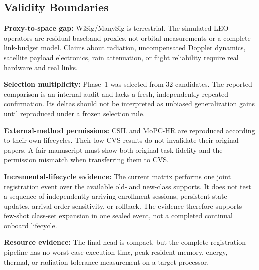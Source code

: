\documentclass[journal]{IEEEtran}
\begin{document}
\subsection{Validity Boundaries}

\textbf{Proxy-to-space gap:} WiSig/ManySig is terrestrial. The simulated LEO operators are residual baseband proxies, not orbital measurements or a complete link-budget model. Claims about radiation, uncompensated Doppler dynamics, satellite payload electronics, rain attenuation, or flight reliability require real hardware and real links.

\textbf{Selection multiplicity:} Phase~1 was selected from 32 candidates. The reported comparison is an internal audit and lacks a fresh, independently repeated confirmation. Its deltas should not be interpreted as unbiased generalization gains until reproduced under a frozen selection rule.

\textbf{External-method permissions:} CSIL and MoPC-HR are reproduced according to their own lifecycles. Their low CVS results do not invalidate their original papers. A fair manuscript must show both original-task fidelity and the permission mismatch when transferring them to CVS.

\textbf{Incremental-lifecycle evidence:} The current matrix performs one joint registration event over the available old- and new-class supports. It does not test a sequence of independently arriving enrollment sessions, persistent-state updates, arrival-order sensitivity, or rollback. The evidence therefore supports few-shot class-set expansion in one sealed event, not a completed continual onboard lifecycle.

\textbf{Resource evidence:} The final head is compact, but the complete registration pipeline has no worst-case execution time, peak resident memory, energy, thermal, or radiation-tolerance measurement on a target processor.
\end{document}
